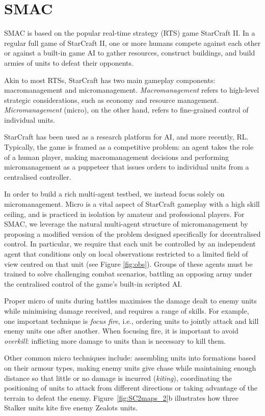 \section{SMAC}

SMAC is based on the popular real-time strategy (RTS) game StarCraft II.
In a regular full game of StarCraft II, one or more humans compete against each other or against a built-in game AI to gather resources, construct buildings, and build armies of units to defeat their opponents.

Akin to most RTSs, StarCraft has two main gameplay components: macromanagement and micromanagement. \emph{Macromanagement} refers to high-level strategic considerations, such as economy and resource management.
\emph{Micromanagement} (micro), on the other hand, refers to fine-grained control of individual units.


StarCraft has been used as a research platform for AI, and more recently, RL. Typically, the game is framed as a competitive problem: an agent takes the role of a human player, making macromanagement decisions and performing micromanagement as a puppeteer that issues orders to individual units from a centralised controller.

In order to build a rich multi-agent testbed, we instead focus solely on micromanagement.
Micro is a vital aspect of StarCraft gameplay with a high skill ceiling, and is practiced in isolation by amateur and professional players.
For SMAC, we leverage the natural multi-agent structure of micromanagement by proposing a modified version of the problem designed specifically for decentralised control.
In particular, we require that each unit be controlled by an independent agent that conditions only on local observations restricted to a limited field of view centred on that unit (see Figure \ref{fig:obs}). 
Groups of these agents must be trained to solve challenging combat scenarios, battling an opposing army under the centralised control of the game's built-in scripted AI.

Proper micro of units during battles maximises the damage dealt to enemy units while minimising damage received, and requires a range of skills.
For example, one important technique is \textit{focus fire}, i.e., ordering units to jointly attack and kill enemy units one after another. When focusing fire, it is important to avoid \textit{overkill}: inflicting more damage to units than is necessary to kill them.

Other common micro techniques include: assembling units into formations based on their armour types, making enemy units give chase while maintaining enough distance so that little or no damage is incurred (\textit{kiting}), coordinating the positioning of units to attack from different directions or taking advantage of the terrain to defeat the enemy. Figure~\ref{fig:SC2maps_2}b illustrates how three Stalker units kite five enemy Zealots units.

